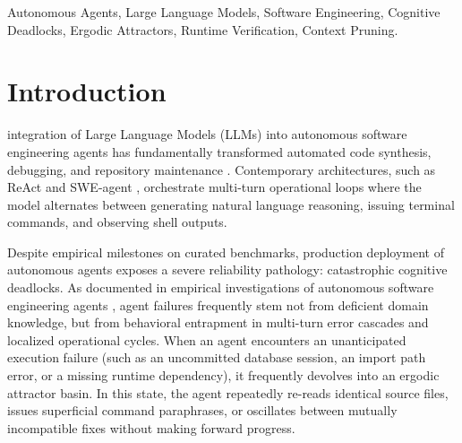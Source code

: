 \documentclass[journal]{IEEEtran}
\begin{document}
\begin{IEEEkeywords}
Autonomous Agents, Large Language Models, Software Engineering, Cognitive Deadlocks, Ergodic Attractors, Runtime Verification, Context Pruning.
\end{IEEEkeywords}

\IEEEpeerreviewmaketitle

\section{Introduction}

 integration of Large Language Models (LLMs) into autonomous software engineering agents has fundamentally transformed automated code synthesis, debugging, and repository maintenance \cite{chen2021codex, jimenez2024swebench, yang2024sweagent}. Contemporary architectures, such as ReAct \cite{yao2023react} and SWE-agent \cite{yang2024sweagent}, orchestrate multi-turn operational loops where the model alternates between generating natural language reasoning, issuing terminal commands, and observing shell outputs.

Despite empirical milestones on curated benchmarks, production deployment of autonomous agents exposes a severe reliability pathology: catastrophic cognitive deadlocks. As documented in empirical investigations of autonomous software engineering agents \cite{xia2025demystifying}, agent failures frequently stem not from deficient domain knowledge, but from behavioral entrapment in multi-turn error cascades and localized operational cycles. When an agent encounters an unanticipated execution failure (such as an uncommitted database session, an import path error, or a missing runtime dependency), it frequently devolves into an ergodic attractor basin. In this state, the agent repeatedly re-reads identical source files, issues superficial command paraphrases, or oscillates between mutually incompatible fixes without making forward progress.
\end{document}

